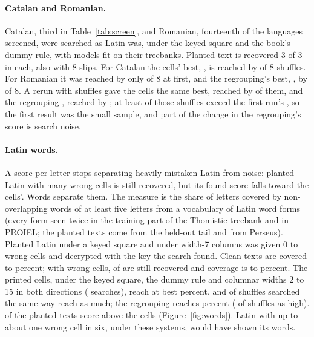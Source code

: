 \documentclass[11pt]{article}
\theoremstyle{definition}
\begin{document}
\paragraph{Catalan and Romanian.} Catalan, third in Table~\ref{tab:screen}, and Romanian, fourteenth of the \allLanguages{} languages screened, were searched as Latin was, under the keyed square and the book's dummy rule, with models fit on their treebanks. Planted text is recovered 3 of 3 in each, also with 8 slips. For Catalan the cells' best, \caCells{}, is reached by \caCellsHigh{} of 8 shuffles. For Romanian it was reached by only \roCellsHigh{} of 8 at first, and the regrouping's best, \roRegroupedFirst{}, by \roRegroupedFirstHigh{} of 8. A rerun with \roWideShuffles{} shuffles gave the cells the same best, reached by \roWideHigh{} of them, and the regrouping \roRegroupedRerun{}, reached by \roWideRegroupedHigh{}; at least \roRegroupedRerunAbove{} of those shuffles exceed the first run's \roRegroupedFirst{}, so the first result was the small sample, and part of the change in the regrouping's score is search noise.

\paragraph{Latin words.} A score per letter stops separating heavily mistaken Latin from noise: planted Latin with many wrong cells is still recovered, but its found score falls toward the cells'. Words separate them. The measure is the share of letters covered by non-overlapping words of at least five letters from a vocabulary of \lwdVocab{} Latin word forms (every form seen twice in the training part of the Thomistic treebank and in PROIEL; the planted texts come from the held-out tail and from Perseus). Planted Latin under a keyed square and under width-7 columns was given 0 to \lwdErrMax{} wrong cells and decrypted with the key the search found. Clean texts are covered \lwdCleanLow{} to \lwdCleanHigh{} percent; with \lwdErrMax{} wrong cells, \lwdWorstRecovered{} of \lwdWorstPlanted{} are still recovered and coverage is \lwdWorstLow{} to \lwdWorstHigh{} percent. The printed cells, under the keyed square, the dummy rule and columnar widths 2 to 15 in both directions (\lwdSearches{} searches), reach at best \lwdCellsBest{} percent, and \lwdCellsAsHigh{} of \lwdShuffles{} shuffles searched the same way reach as much; the regrouping reaches \lwdRegroupedBest{} percent (\lwdRegroupedAsHigh{} of \lwdShuffles{} shuffles as high). \lwdAbove{} of the \lwdPlanted{} planted texts score above the cells (Figure~\ref{fig:words}). Latin with up to about one wrong cell in six, under these systems, would have shown its words.
\end{document}
